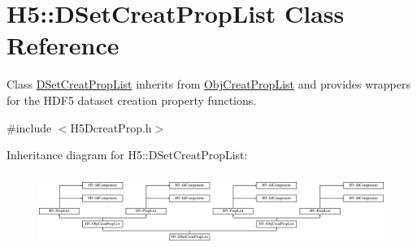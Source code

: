 \hypertarget{class_h5_1_1_d_set_creat_prop_list}{}\section{H5\+:\+:D\+Set\+Creat\+Prop\+List Class Reference}
\label{class_h5_1_1_d_set_creat_prop_list}


Class \hyperlink{class_h5_1_1_d_set_creat_prop_list}{D\+Set\+Creat\+Prop\+List} inherits from \hyperlink{class_h5_1_1_obj_creat_prop_list}{Obj\+Creat\+Prop\+List} and provides wrappers for the H\+D\+F5 dataset creation property functions.  




{\ttfamily \#include $<$H5\+Dcreat\+Prop.\+h$>$}

Inheritance diagram for H5\+:\+:D\+Set\+Creat\+Prop\+List\+:\begin{figure}[H]
\begin{center}
\leavevmode
\includegraphics[height=2.397260cm]{class_h5_1_1_d_set_creat_prop_list}
\end{center}
\end{figure}
